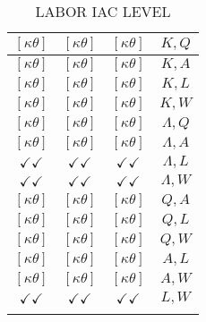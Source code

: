 \documentclass[a4paper,10pt]{article}
\begin{document}
\begin{longtable}{|c|c|c|c|}
$[\kappa \theta ]$ & $[\kappa \theta ]$ & $[\kappa \theta ]$ & ${K},{Q}$ \\
\hline
$[\kappa \theta ]$ & $[\kappa \theta ]$ & $[\kappa \theta ]$ & ${K},{A}$ \\
\hline
$[\kappa \theta ]$ & $[\kappa \theta ]$ & $[\kappa \theta ]$ & ${K},{L}$ \\
\hline
$[\kappa \theta ]$ & $[\kappa \theta ]$ & $[\kappa \theta ]$ & ${K},{W}$ \\
\hline
$[\kappa \theta ]$ & $[\kappa \theta ]$ & $[\kappa \theta ]$ & ${\Lambda},{Q}$ \\
\hline
$[\kappa \theta ]$ & $[\kappa \theta ]$ & $[\kappa \theta ]$ & ${\Lambda},{A}$ \\
\hline
$\checkmark\checkmark$ & $\checkmark\checkmark$ & $\checkmark\checkmark$ & ${\Lambda},{L}$ \\
\hline
$\checkmark\checkmark$ & $\checkmark\checkmark$ & $\checkmark\checkmark$ & ${\Lambda},{W}$ \\
\hline
$[\kappa \theta ]$ & $[\kappa \theta ]$ & $[\kappa \theta ]$ & ${Q},{A}$ \\
\hline
$[\kappa \theta ]$ & $[\kappa \theta ]$ & $[\kappa \theta ]$ & ${Q},{L}$ \\
\hline
$[\kappa \theta ]$ & $[\kappa \theta ]$ & $[\kappa \theta ]$ & ${Q},{W}$ \\
\hline
$[\kappa \theta ]$ & $[\kappa \theta ]$ & $[\kappa \theta ]$ & ${A},{L}$ \\
\hline
$[\kappa \theta ]$ & $[\kappa \theta ]$ & $[\kappa \theta ]$ & ${A},{W}$ \\
\hline
$\checkmark\checkmark$ & $\checkmark\checkmark$ & $\checkmark\checkmark$ & ${L},{W}$ \\
\hline
\caption{LABOR IAC LEVEL}
\label{table:MyTableLabel}
\end{longtable}
\end{document}
